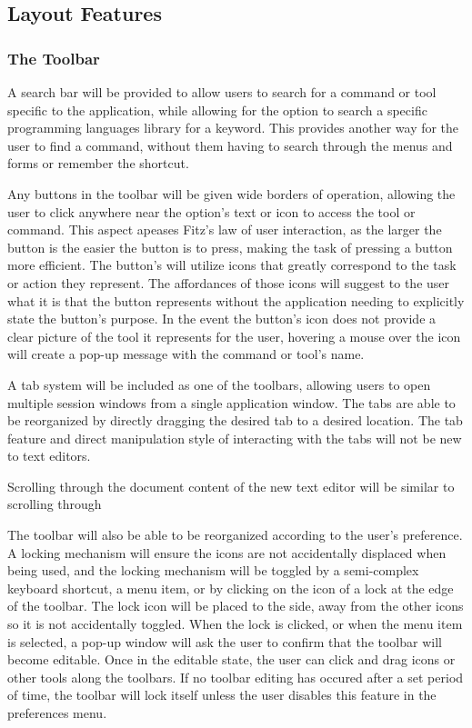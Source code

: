 \documentclass[11pt, oneside]{article}
\begin{document}
\subsection{Layout Features}
\subsubsection{The Toolbar}
A search bar will be provided to allow users to search for a command or tool specific to the application, while allowing for the option to search a specific programming languages library for a keyword. This provides another way for the user to find a command, without them having to search through the menus and forms or remember the shortcut. 

Any buttons in the toolbar will be given wide borders of operation, allowing the user to click anywhere near the option's text or icon to access the tool or command. This aspect apeases Fitz's law of user interaction, as the larger the button is the easier the button is to press, making the task of pressing a button more efficient. The button's will utilize icons that greatly correspond to the task or action they represent. The affordances of those icons will suggest to the user what it is that the button represents without the application needing to explicitly state the button's purpose. In the event the button's icon does not provide a clear picture of the tool it represents for the user, hovering a mouse over the icon will create a pop-up message with the command or tool's name. 

A tab system will be included as one of the toolbars, allowing users to open multiple session windows from a single application window. The tabs are able to be reorganized by directly dragging the desired tab to a desired location. The tab feature and direct manipulation style of interacting with the tabs will not be new to text editors. %

Scrolling through the document content of the new text editor will be similar to scrolling through

The toolbar will also be able to be reorganized according to the user's preference. A locking mechanism will ensure the icons are not accidentally displaced when being used, and the locking mechanism will be toggled by a semi-complex keyboard shortcut, a menu item, or by clicking on the icon of a lock at the edge of the toolbar. The lock icon will be placed to the side, away from the other icons so it is not accidentally toggled. When the lock is clicked, or when the menu item is selected, a pop-up window will ask the user to confirm that the toolbar will become editable. Once in the editable state, the user can click and drag icons or other tools along the toolbars. If no toolbar editing has occured after a set period of time, the toolbar will lock itself unless the user disables this feature in the preferences menu. 
\end{document}
